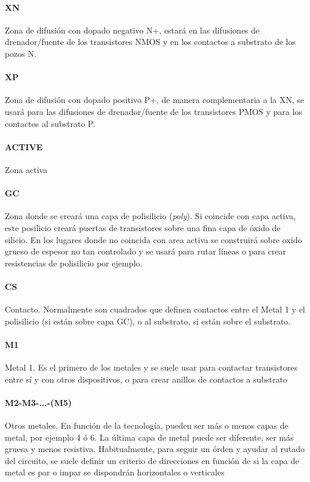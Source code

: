 \paragraph{XN}
Zona de difusión con dopado negativo N+, estará en las difusiones de drenador/fuente
de los transistores NMOS y en los contactos a substrato de los pozos N.

\paragraph{XP}
Zona de difusión con dopado positivo P+, de manera complementaria a la XN,
se usará para las difusiones de drenador/fuente
de los transistores PMOS y para los contactos al substrato P.

\paragraph{ACTIVE}
Zona activa

\paragraph{GC}
Zona donde se creará una capa de polisilicio (\textit{poly}). Si coincide con capa activa,
este posilicio creará puertas de transistores sobre una fina capa de óxido de silicio.
En los lugares donde no coincida con area activa se construirá sobre oxido grueso
de espesor no tan controlado y se usará para rutar líneas o para crear resistencias
de polisilicio por ejemplo.

\paragraph{CS}
Contacto. Normalmente son cuadrados que definen contactos entre el Metal 1 y el
polisilicio (si están sobre capa GC), o al substrato, si están sobre el substrato.

\paragraph{M1} Metal 1. Es el primero de los metales y se suele usar para contactar
transistores entre sí y con otros dispositivos, o para crear anillos de contactos
a substrato

\paragraph{M2-M3-...-(M5)} Otros metales. En función de la tecnología, pueden ser
más o menos capas de metal, por ejemplo 4 ó 6. La última capa de metal puede ser
diferente, ser más gruesa y menos resistiva. Habitualmente, para seguir un órden
y ayudar al rutado del circuito, se suele definir un criterio de direcciones
en función de si la capa de metal es par o impar se dispondrán horizontales o
verticales

